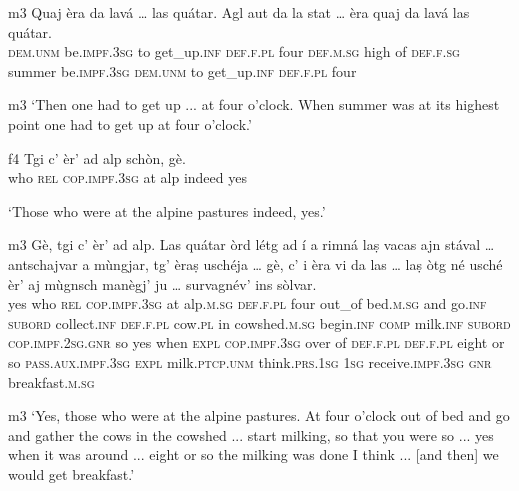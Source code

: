 \begin{linenumbers}
	\gll {\ob}m3{\cb} Quaj èra da lavá … las quátar. Agl aut da la stat … èra quaj da lavá las quátar.\\
	{} \textsc{dem.unm} be.\textsc{impf.3sg} to get\_up.\textsc{inf} {} \textsc{def.f.pl} four \textsc{def.m.sg} high of \textsc{def.f.sg} summer {} be.\textsc{impf.3sg} \textsc{dem.unm} to get\_up.\textsc{inf} \textsc{def.f.pl} four \\
	\end{linenumbers}
\medskip
\glt {\ob}m3{\cb} `Then one had to get up ... at four o'clock. When summer was at its highest point one had to get up at four o'clock.'
\medskip

\begin{linenumbers}
	\gll {\ob}f4{\cb} Tgi c’ èr’ ad alp schòn, gè.   \\
	{} who \textsc{rel} \textsc{cop.impf.3sg} at alp indeed yes\\
\end{linenumbers}
\medskip
\glt `Those who were at the alpine pastures indeed, yes.'
\medskip

\begin{linenumbers}
	\gll {\ob}m3{\cb} Gè, tgi c’ èr’ ad alp. Las quátar òrd létg ad í a rimná laṣ vacas ajn stával … antschajvar a mùngjar, tg’ èraṣ uschéja … gè, c' i èra vi da las … laṣ òtg né usché èr’ aj mùgnsch manègj’ ju … survagnév’ ins sòlvar.\\
	{} yes who \textsc{rel} \textsc{cop.impf.3sg} at alp.\textsc{m.sg} \textsc{def.f.pl} four out\_of bed.\textsc{m.sg} and go.\textsc{inf} \textsc{subord} collect.\textsc{inf} \textsc{def.f.pl} cow.\textsc{pl} in cowshed.\textsc{m.sg} {} begin.\textsc{inf} \textsc{comp} milk.\textsc{inf} \textsc{subord} \textsc{cop.impf.2sg.gnr} so {} yes when \textsc{expl} \textsc{cop.impf.3sg} over of \textsc{def.f.pl} {} \textsc{def.f.pl} eight or so \textsc{pass.aux.impf.3sg} \textsc{expl} milk.\textsc{ptcp.unm} think.\textsc{prs.1sg} \textsc{1sg} {} receive.\textsc{impf.3sg} \textsc{gnr} breakfast.\textsc{m.sg} \\
\end{linenumbers}
\medskip
\glt {\ob}m3{\cb} `Yes, those who were at the alpine pastures. At four o'clock out of bed and go and gather the cows in the cowshed ... start milking, so that you were so ... yes when it was around ... eight or so the milking was done I think ... [and then] we would get breakfast.'
\medskip

